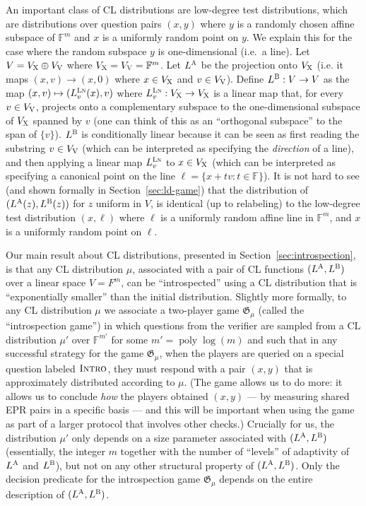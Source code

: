 \documentclass[11pt]{article}
\theoremstyle{definition}
\newcommand{\F}{\ensuremath{\mathbb{F}}}
\DeclareMathOperator{\poly}{poly}
\newcommand{\game}{\mathfrak{G}}
\newcommand{\labelstyle}[1]{\ensuremath{\textsc{#1}}\xspace}
\newcommand{\xpt}{\labelstyle{X}}
\newcommand{\dir}[1]{\labelstyle{V#1}}
\newcommand{\lnf}{\labelstyle{Ln}}
\newcommand{\alice}{\labelstyle{A}}
\newcommand{\bob}{\labelstyle{B}}
\newcommand{\typestyle}[1]{\ensuremath{\textsc{#1}}\xspace}
\newcommand{\Introspect}{\typestyle{Intro}}
\begin{document}
An important class of CL distributions are low-degree test distributions, which are distributions over question pairs $(x,y)$ where $y$ is a randomly chosen affine subspace of $\F^m$ and $x$ is a uniformly random point on $y$. We explain this for the case where the random subspace $y$ is one-dimensional (i.e.\ a line). Let $V = V_\xpt \oplus V_{\dir{}}$ where $V_\xpt = V_{\dir{}} = \F^m$. Let $L^\alice$ be the projection onto $V_\xpt$ (i.e. it maps $(x,v) \to (x,0)$ where $x \in V_\xpt$ and $v \in V_{\dir{}}$). Define $L^\bob: V \to V$ as the map $(x,v) \mapsto (L^\lnf_v(x),v)$ where $L^\lnf_v: V_\xpt \to V_\xpt$ is a linear map that, for every $v \in V_{\dir{}}$, projects onto a complementary subspace to the one-dimensional subspace of $V_\xpt$ spanned by $v$ (one can think of this as an ``orthogonal subspace'' to the span of $\{ v \}$). $L^\bob$ is conditionally linear because it can be seen as first reading the substring $v \in V_{\dir{}}$ (which can be interpreted as specifying the \emph{direction} of a line), and then applying a linear map $L^\lnf_v$ to $x \in V_\xpt$ (which can be interpreted as specifying a canonical point on the line $\ell = \{ x + tv : t \in \F \}$). It is not hard to see (and shown formally in Section~\ref{sec:ld-game}) that the distribution of $(L^\alice(z),L^\bob(z))$ for $z$ uniform in $V$, is identical (up to relabeling) to the low-degree test distribution $(x,\ell)$ where $\ell$ is a uniformly random affine line in $\F^m$, and $x$ is a uniformly random point on $\ell$.





Our main result about CL distributions, presented in Section~\ref{sec:introspection}, is that any CL distribution $\mu$, associated with a pair of CL functions $(L^\alice,L^\bob)$ over a linear space $V=F^m$, can be ``introspected'' using a CL distribution that is ``exponentially smaller'' than the initial distribution. Slightly more formally, to any CL distribution $\mu$ we associate a two-player game $\game_\mu$ (called the ``introspection game'') in which questions from the verifier are sampled from a CL distribution $\mu'$ over $\F^{m'}$ for some $m' = \poly\log(m)$ and such that in any successful strategy for the game $\game_\mu$, when the players are queried on a special question labeled $\Introspect$, they must respond with a pair $(x,y)$ that is approximately distributed according to $\mu$.
(The game allows us to do more: it allows us to conclude \emph{how} the players obtained $(x,y)$ --- by measuring shared EPR pairs in a specific basis --- and this will be important when using the game as part of a larger protocol that involves other checks.) 
Crucially for us, the distribution $\mu'$ only depends on a size parameter associated with $(L^\alice,L^\bob)$ (essentially, the integer $m$ together with the number of ``levels'' of adaptivity of $L^\alice$ and $L^\bob$), but not on any other structural property of $(L^\alice,L^\bob)$. Only the decision predicate for the introspection game $\game_\mu$ depends on the entire description of $(L^\alice,L^\bob)$.
\end{document}
